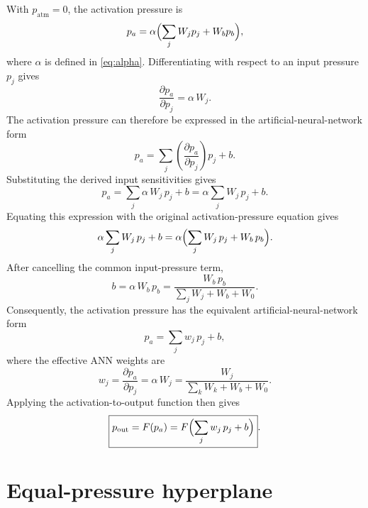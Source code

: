 \documentclass[11pt,a4paper]{article}
\numberwithin{equation}{section}
\newcommand{\pout}{p_{\mathrm{out}}}
\newcommand{\patm}{p_{\mathrm{atm}}}
\begin{document}
\begin{appendices}
With $\patm = 0$, the activation pressure is
\begin{equation}
  p_a = \alpha\Bigl(\sum_j W_j p_j + W_b p_b\Bigr),
\end{equation}
where $\alpha$ is defined in \cref{eq:alpha}. Differentiating with respect to an input pressure $p_j$ gives
\begin{equation}
  \frac{\partial p_a}{\partial p_j} = \alpha\,W_j .
\end{equation}
The activation pressure can therefore be expressed in the artificial-neural-network form
\begin{equation}
  p_a = \sum_j \left(\frac{\partial p_a}{\partial p_j}\right) p_j + b .
\end{equation}
Substituting the derived input sensitivities gives
\begin{equation}
  p_a = \sum_j \alpha\,W_j\,p_j + b = \alpha \sum_j W_j\,p_j + b .
\end{equation}
Equating this expression with the original activation-pressure equation gives
\begin{equation}
  \alpha \sum_j W_j\,p_j + b = \alpha\Bigl(\sum_j W_j\,p_j + W_b\,p_b\Bigr) .
\end{equation}
After cancelling the common input-pressure term,
\begin{equation}
  \boxed{b = \alpha\,W_b\,p_b = \frac{W_b\,p_b}{\sum_j W_j + W_b + W_0}} .
\end{equation}
Consequently, the activation pressure has the equivalent artificial-neural-network form
\begin{equation}
  \boxed{p_a = \sum_j w_j\,p_j + b},
\end{equation}
where the effective ANN weights are
\begin{equation}
  \boxed{w_j = \frac{\partial p_a}{\partial p_j} = \alpha\,W_j = \frac{W_j}{\sum_k W_k + W_b + W_0}} .
\end{equation}
Applying the activation-to-output function then gives
\begin{equation}
  \boxed{\pout = F(p_a) = F\Bigl(\sum_j w_j\,p_j + b\Bigr)} .
\end{equation}

\section{Equal-pressure hyperplane}
\label{app:hyperplane}


\end{appendices}
\end{document}

